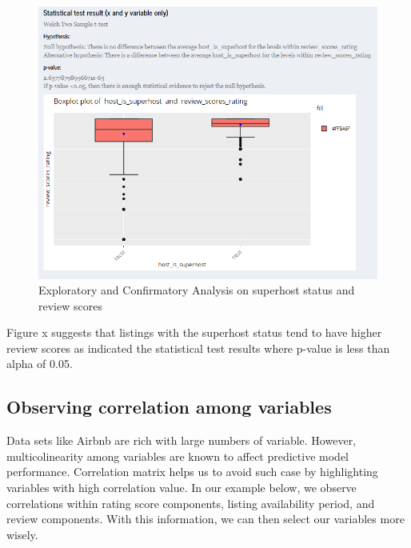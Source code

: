 \documentclass{acm_proc_article-sp}
\begin{document}
\begin{figure}[H]

{\centering \includegraphics[width=1\linewidth]{images/usecase_explore4} 

}

\caption{Exploratory and Confirmatory Analysis on superhost status and review scores}\label{fig:unnamed-chunk-19}
\end{figure}

Figure x suggests that listings with the superhost status tend to have
higher review scores as indicated the statistical test results where
p-value is less than alpha of 0.05.

\hypertarget{observing-correlation-among-variables}{%
\subsection{Observing correlation among
variables}\label{observing-correlation-among-variables}}

Data sets like Airbnb are rich with large numbers of variable. However,
multicolinearity among variables are known to affect predictive model
performance. Correlation matrix helps us to avoid such case by
highlighting variables with high correlation value. In our example
below, we observe correlations within rating score components, listing
availability period, and review components. With this information, we
can then select our variables more wisely.
\end{document}
